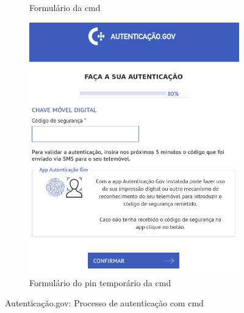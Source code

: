 \begin{figure}[H]
\begin{subfigure}{.32\textwidth}
\begin{center}
    \end{center}
    \caption{Formulário da \acrshort{cmd}}
\end{subfigure}
\begin{subfigure}{.32\textwidth}
    \begin{center}
        \includegraphics[width=1\linewidth]{img/CMDcredTemp.png}
    \end{center}
    \caption{Formulário do \acrshort{pin} temporário da \acrshort{cmd}}
\end{subfigure}
\caption{Autenticação.gov: Processo de autenticação com \acrshort{cmd}}
\end{figure}

